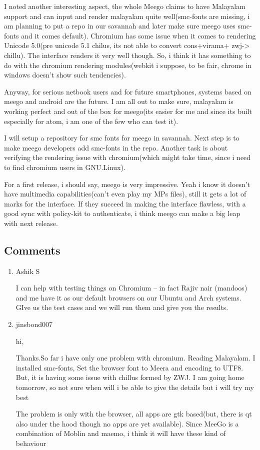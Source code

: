 I noted another interesting aspect, the whole Meego claims to have Malayalam support and can input and render 
malayalam quite well(smc-fonts are missing, i am planning to put a repo in our savannah and later make sure 
meego uses smc-fonts and it comes default). Chromium has some issue when it comes to rendering Unicode 
5.0(pre unicode 5.1 chilus, its not able to convert cons+virama+ zwj-> chillu). 
The interface renders it very well though. So, i think it has something to do with the chromium 
rendering modules(webkit i suppose, to be fair, chrome in windows doesn’t show such tendencies).

Anyway, for serious netbook users and for future smartphones, systems based on meego and android are the 
future. I am all out to make sure, malayalam is working perfect and out of the box for meego(its easier 
for me and since its built especially for atom, i am one of the few who can test it).

I will setup a repository for smc fonts for meego in savannah. Next step is to make meego developers add smc-fonts 
in the repo. Another task is about verifying the rendering issue with chromium(which might take time, since i need to 
find chromium users in GNU.Linux).

For a first release, i should say, meego is very impressive. Yeah i know it doesn't have multimedia capabilities(can't even 
play my MPs files), still it gets a lot of marks for the interface. If they succeed in making the interface flawless, 
with a good sync with policy-kit to authenticate, i think meego can make a big leap with next release.


\subsection*{Comments}
\begin{enumerate}
 \item{Ashik S}
 
I can help with testing things on Chromium – in fact Rajiv nair (mandoos) and me have it as our default browsers on 
our Ubuntu and Arch systems. GIve us the test cases and we will run them and give you the results.

 \item{jinsbond007}
 
hi,

Thanks.So far i have only one problem with chromium. Reading Malayalam.
I installed smc-fonts, Set the browser font to Meera and encoding to UTF8. But, it is having some issue with chillus 
formed by ZWJ.
I am going home tomorrow, so not sure when will i be able to give the details but i will try my best 

The problem is only with the browser, all apps are gtk based(but, there is qt also under the hood though no apps 
are yet available). Since MeeGo is a combination of Moblin and maemo, i think it will have these kind of behaviour 

\end{enumerate}

\newpage 
